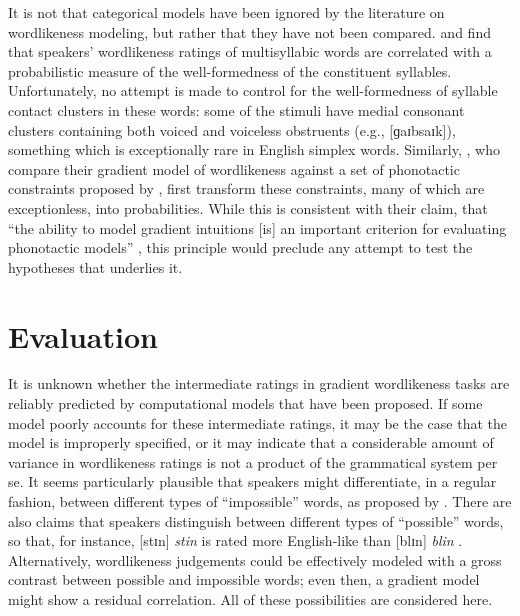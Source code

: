 It is not that categorical models have been ignored by the literature on wordlikeness modeling, but rather that they have not been compared. 
\citet{Frisch2000} and \citet{Vitevitch1997} find that speakers' wordlikeness ratings of multisyllabic words are correlated with a probabilistic measure of the well-formedness of the constituent syllables. 
Unfortunately, no attempt is made to control for the well-formedness of syllable contact clusters in these words: some of the stimuli have medial consonant clusters containing both voiced and voiceless obstruents (e.g., [ɡaɪbsaɪk]), something which is exceptionally rare in English simplex words.
Similarly, \citet{Hayes2008a}, who compare their gradient model of wordlikeness against a set of phonotactic constraints proposed by \citet{Clements1983}, first transform these constraints, many of which are exceptionless, into probabilities. 
While this is consistent with their claim, that ``the ability to model gradient intuitions [is] an important criterion for evaluating phonotactic models'' \citep[382]{Hayes2008a}, this principle would preclude any attempt to test the hypotheses that underlies it.



\section{Evaluation}
\label{2evaluation}

It is unknown whether the intermediate ratings in gradient wordlikeness tasks are reliably predicted by computational models that have been proposed. 
If some model poorly accounts for these intermediate ratings, it may be the case that the model is improperly specified, or it may indicate that a considerable amount of variance in wordlikeness ratings is not a product of the grammatical system per se. 
It seems particularly plausible that speakers might differentiate, in a regular fashion, between different types of ``impossible'' words, as proposed by \citet{SPE}. 
There are also claims that speakers distinguish between different types of ``possible'' words, so that, for instance, [stɪn] \emph{stin} is rated more English-like than [blɪn] \emph{blin} \citep{Albright2009a}. 
Alternatively, wordlikeness judgements could be effectively modeled with a gross contrast between possible and impossible words; even then, a gradient model might show a residual correlation.
All of these possibilities are considered here.

